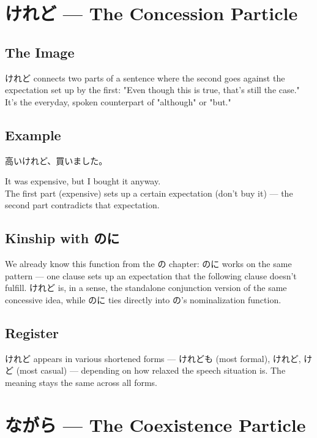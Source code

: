 \documentclass[12pt]{book}
\begin{document}
\chapter{けれど — The Concession Particle}

\section*{The Image}

けれど connects two parts of a sentence where the second goes against the expectation set up by the first: "Even though this is true, that's still the case." It's the everyday, spoken counterpart of "although" or "but."

\section*{Example}

\par\quad 高いけれど、買いました。\\
\par\quad It was expensive, but I bought it anyway.\\

The first part (expensive) sets up a certain expectation (don't buy it) — the second part contradicts that expectation.

\section*{Kinship with のに}

We already know this function from the の chapter: のに works on the same pattern — one clause sets up an expectation that the following clause doesn't fulfill. けれど is, in a sense, the standalone conjunction version of the same concessive idea, while のに ties directly into の's nominalization function.

\section*{Register}

けれど appears in various shortened forms — けれども (most formal), けれど, けど (most casual) — depending on how relaxed the speech situation is. The meaning stays the same across all forms.


\chapter{ながら — The Coexistence Particle}
\end{document}
